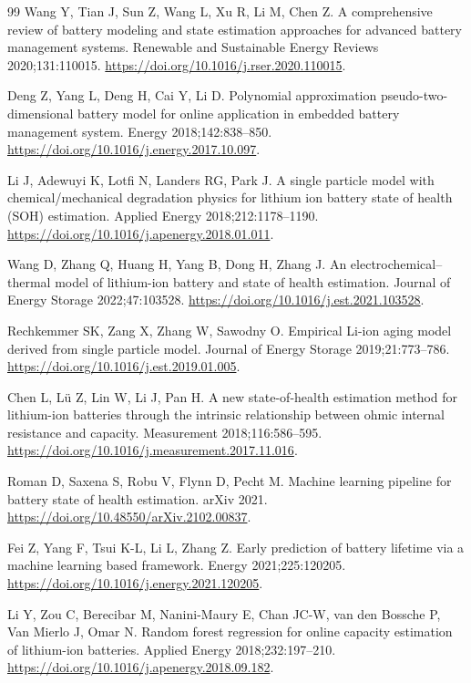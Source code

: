 \begin{thebibliography}{99}
 Wang Y, Tian J, Sun Z, Wang L, Xu R, Li M, Chen Z. A comprehensive review of battery modeling and state estimation approaches for advanced battery management systems. Renewable and Sustainable Energy Reviews 2020;131:110015. \url{https://doi.org/10.1016/j.rser.2020.110015}.

 Deng Z, Yang L, Deng H, Cai Y, Li D. Polynomial approximation pseudo-two-dimensional battery model for online application in embedded battery management system. Energy 2018;142:838–850. \url{https://doi.org/10.1016/j.energy.2017.10.097}.

 Li J, Adewuyi K, Lotfi N, Landers RG, Park J. A single particle model with chemical/mechanical degradation physics for lithium ion battery state of health (SOH) estimation. Applied Energy 2018;212:1178–1190. \url{https://doi.org/10.1016/j.apenergy.2018.01.011}.

 Wang D, Zhang Q, Huang H, Yang B, Dong H, Zhang J. An electrochemical–thermal model of lithium-ion battery and state of health estimation. Journal of Energy Storage 2022;47:103528. \url{https://doi.org/10.1016/j.est.2021.103528}.

 Rechkemmer SK, Zang X, Zhang W, Sawodny O. Empirical Li-ion aging model derived from single particle model. Journal of Energy Storage 2019;21:773–786. \url{https://doi.org/10.1016/j.est.2019.01.005}.

 Chen L, Lü Z, Lin W, Li J, Pan H. A new state-of-health estimation method for lithium-ion batteries through the intrinsic relationship between ohmic internal resistance and capacity. Measurement 2018;116:586–595. \url{https://doi.org/10.1016/j.measurement.2017.11.016}.

 Roman D, Saxena S, Robu V, Flynn D, Pecht M. Machine learning pipeline for battery state of health estimation. arXiv 2021. \url{https://doi.org/10.48550/arXiv.2102.00837}.

 Fei Z, Yang F, Tsui K-L, Li L, Zhang Z. Early prediction of battery lifetime via a machine learning based framework. Energy 2021;225:120205. \url{https://doi.org/10.1016/j.energy.2021.120205}.

 Li Y, Zou C, Berecibar M, Nanini-Maury E, Chan JC-W, van den Bossche P, Van Mierlo J, Omar N. Random forest regression for online capacity estimation of lithium-ion batteries. Applied Energy 2018;232:197–210. \url{https://doi.org/10.1016/j.apenergy.2018.09.182}.


\end{thebibliography}
